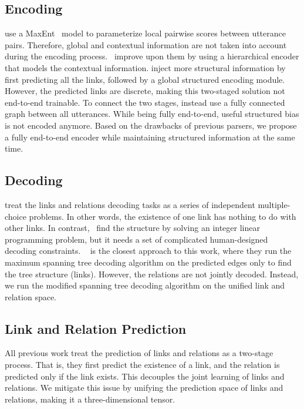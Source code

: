 \documentclass[11pt]{article}
\begin{document}
\subsection{Encoding}
\citet{afantenos2015discourse,perret2016integer} use a MaxEnt~\cite{ratnaparkhi1997simple} model to parameterize local pairwise scores between utterance pairs. Therefore, global and contextual information are not taken into account during the encoding process.~\citet{liu-chen-2021-improving} improve upon them by using a hierarchical encoder that models the contextual information.
\citet{shi2019deep} inject more structural information by first predicting all the links, followed by a global structured encoding module. However, the predicted links are discrete, making this two-staged solution not end-to-end trainable. To connect the two stages, \citet{wangstructure} instead use a fully connected graph between all utterances. While being fully end-to-end, useful structured bias is not encoded anymore. Based on the drawbacks of previous parsers, we propose a fully end-to-end encoder while maintaining structured information at the same time.

\subsection{Decoding}
\citet{shi2019deep,wangstructure,liu-chen-2021-improving} treat the links and relations decoding tasks as a series of independent multiple-choice problems. In other words, the existence of one link has nothing to do with other links. In contrast,~\citet{perret2016integer} find the structure by solving an integer linear programming problem, but it needs a set of complicated human-designed decoding constraints.
~\citet{afantenos2015discourse} is the closest approach to this work, where they run the maximum spanning tree decoding algorithm on the predicted edges only to find the tree structure (links). However, the relations are not jointly decoded. Instead, we run the modified spanning tree decoding algorithm on the unified link and relation space.

\subsection{Link and Relation Prediction}
All previous work treat the prediction of links and relations as a two-stage process. That is, they first predict the existence of a link, and the relation is predicted only if the link exists. This decouples the joint learning of links and relations. We mitigate this issue by unifying the prediction space of links and relations, making it a three-dimensional tensor.
\end{document}
